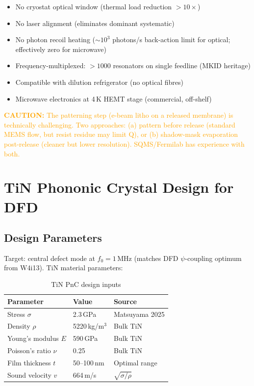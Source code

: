\documentclass[11pt]{article}
\theoremstyle{remark}
\newcommand{\caution}[1]{\textcolor{orange}{\textbf{CAUTION:} #1}}
\begin{document}
\begin{tcolorbox}[colback=green!5!white, colframe=green!50!black,
  title=\textbf{Advantages over Optical Readout}]
\begin{itemize}[nosep]
  \item No cryostat optical window (thermal load reduction $> 10\times$)
  \item No laser alignment (eliminates dominant systematic)
  \item No photon recoil heating ($\sim 10^3$ photons/s back-action limit
    for optical; effectively zero for microwave)
  \item Frequency-multiplexed: $> 1000$ resonators on single feedline
    (MKID heritage)
  \item Compatible with dilution refrigerator (no optical fibres)
  \item Microwave electronics at 4\,K HEMT stage (commercial, off-shelf)
\end{itemize}
\end{tcolorbox}

\caution{The patterning step (e-beam litho on a released membrane) is
technically challenging. Two approaches: (a) pattern before release
(standard MEMS flow, but resist residue may limit Q), or
(b) shadow-mask evaporation post-release (cleaner but lower resolution).
SQMS/Fermilab has experience with both.}


\section{TiN Phononic Crystal Design for DFD}
\label{sec:PnC}

\subsection{Design Parameters}

Target: central defect mode at $f_0 = 1$\,MHz (matches DFD
$\psi$-coupling optimum from W4i13). TiN material parameters:

\begin{table}[H]
\centering
\caption{TiN PnC design inputs}
\begin{tabular}{@{}lll@{}}
\toprule
Parameter & Value & Source \\
\midrule
Stress $\sigma$ & 2.3\,GPa & Matsuyama 2025 \\
Density $\rho$ & 5220\,kg/m$^3$ & Bulk TiN \\
Young's modulus $E$ & 590\,GPa & Bulk TiN \\
Poisson's ratio $\nu$ & 0.25 & Bulk TiN \\
Film thickness $t$ & 50--100\,nm & Optimal range \\
Sound velocity $v$ & 664\,m/s & $\sqrt{\sigma/\rho}$ \\
\bottomrule
\end{tabular}
\end{table}
\end{document}
